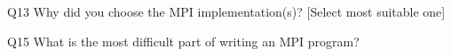 \begin{description}%
\item{Q13} Why did you choose the MPI implementation(s)? [Select most suitable one]%
\item{Q15} What is the most difficult part of writing an MPI program?%
\end{description}%
